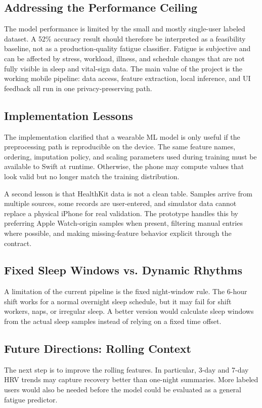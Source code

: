 \documentclass[sigconf,10pt]{acmart}
\begin{document}
\subsection{Addressing the Performance Ceiling}
The model performance is limited by the small and mostly single-user labeled dataset. A 52\% accuracy result should therefore be interpreted as a feasibility baseline, not as a production-quality fatigue classifier. Fatigue is subjective and can be affected by stress, workload, illness, and schedule changes that are not fully visible in sleep and vital-sign data. The main value of the project is the working mobile pipeline: data access, feature extraction, local inference, and UI feedback all run in one privacy-preserving path.

\subsection{Implementation Lessons}
The implementation clarified that a wearable ML model is only useful if the preprocessing path is reproducible on the device. The same feature names, ordering, imputation policy, and scaling parameters used during training must be available to Swift at runtime. Otherwise, the phone may compute values that look valid but no longer match the training distribution.

A second lesson is that HealthKit data is not a clean table. Samples arrive from multiple sources, some records are user-entered, and simulator data cannot replace a physical iPhone for real validation. The prototype handles this by preferring Apple Watch-origin samples when present, filtering manual entries where possible, and making missing-feature behavior explicit through the contract.

\subsection{Fixed Sleep Windows vs. Dynamic Rhythms}
A limitation of the current pipeline is the fixed night-window rule. The 6-hour shift works for a normal overnight sleep schedule, but it may fail for shift workers, naps, or irregular sleep. A better version would calculate sleep windows from the actual sleep samples instead of relying on a fixed time offset.

\subsection{Future Directions: Rolling Context}
The next step is to improve the rolling features. In particular, 3-day and 7-day HRV trends may capture recovery better than one-night summaries. More labeled users would also be needed before the model could be evaluated as a general fatigue predictor.
\end{document}
